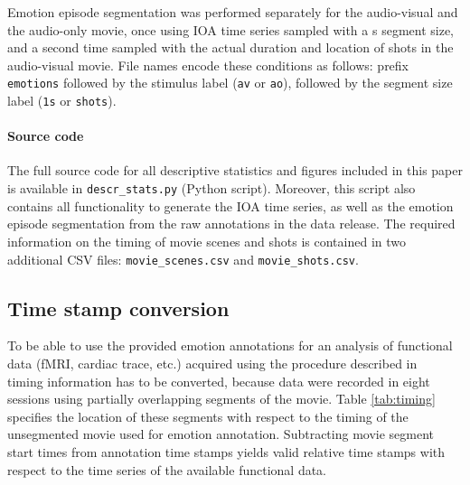 \documentclass[10pt,a4paper,twocolumn]{article}
\begin{document}
Emotion episode segmentation was performed separately for the audio-visual and
the audio-only movie, once using IOA time series sampled with a \unit[1]{s}
segment size, and a second time sampled with the actual duration and location of
shots in the audio-visual movie. File names encode these conditions as follows:
prefix \texttt{emotions} followed by the stimulus label (\texttt{av} or
\texttt{ao}), followed by the segment size label (\texttt{1s} or
\texttt{shots}).


\paragraph{Source code}

The full source code for all descriptive statistics and figures included in
this paper is available in \texttt{descr\_stats.py} (Python script). Moreover,
this script also contains all functionality to generate the IOA time series, as
well as the emotion episode segmentation from the raw annotations in the data
release. The required information on the timing of movie scenes and shots is
contained in two additional CSV files: \texttt{movie\_scenes.csv} and
\texttt{movie\_shots.csv}.


\subsection*{Time stamp conversion}

To be able to use the provided emotion annotations for an analysis of
functional data (fMRI, cardiac trace, etc.) acquired using the procedure
described in~\cite{HBI+14} timing information has to be converted, because data
were recorded in eight sessions using partially overlapping segments of the
movie. Table \ref{tab:timing} specifies the location of these segments with
respect to the timing of the unsegmented movie used for emotion annotation.
Subtracting movie segment start times from annotation time stamps yields valid
relative time stamps with respect to the time series of the available
functional data.
\end{document}
